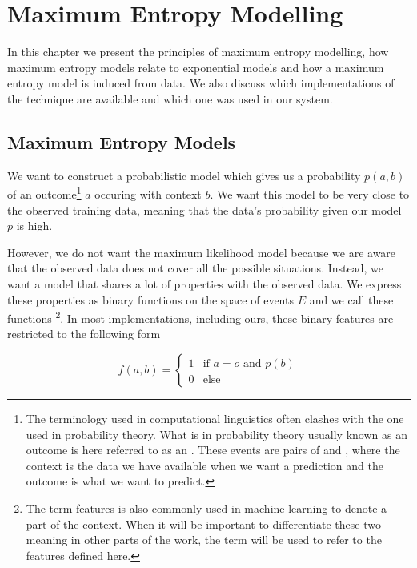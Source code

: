 \chapter{Maximum Entropy Modelling}
\label{chap:maxent}

In this chapter we present the principles of maximum entropy modelling, how
maximum entropy models relate to exponential models and how a maximum entropy
model is induced from data. We also discuss which implementations of the
technique are available and which one was used in our system.

\section{Maximum Entropy Models}
\label{chap:maxent-maxent} 

We want to construct a probabilistic model which gives us a probability
$p(a,b)$ of an outcome\footnote{The terminology used in computational
linguistics often clashes with the one used in probability theory. What is in
probability theory usually known as an outcome is here referred to as an
. These events are pairs of  and
, where the context is the data we have available when we
want a prediction and the outcome is what we want to predict.} $a$ occuring
with context $b$. We want this model to be very close to the observed training
data, meaning that the data's probability given our model $p$ is high.

However, we do not want the maximum likelihood model because we
are aware that the observed data does not cover all the possible situations.
Instead, we want a model that shares a lot of properties with the observed
data. We express these properties as binary functions on the space of events
$E$ and we call these functions \footnote{The term features
is also commonly used in machine learning to denote a part of the context. When
it will be important to differentiate these two meaning in other parts of the
work, the term  will be used to refer to the
features defined here.}. In most implementations, including ours, these binary
features are restricted to the following form

\begin{equation}
\label{eq:common-feature}
f(a,b) =
\begin{cases}
  1 & \text{if } a=o \text{ and } p(b) \\
  0 & \text{else}
\end{cases}
\end{equation}

